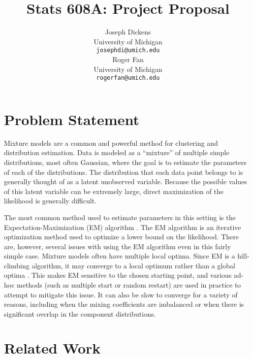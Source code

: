 \documentclass{article}
\theoremstyle{definition}
\begin{document}
\title{Stats 608A: Project Proposal}
\author{
  Joseph Dickens \\
  University of Michigan \\
  \texttt{josephdi@umich.edu} \\
\And
  Roger Fan \\
  University of Michigan\\
  \texttt{rogerfan@umich.edu} \\
}

\maketitle


\section{Problem Statement}

Mixture models are a common and powerful method for clustering and distribution estimation. Data is modeled as a ``mixture'' of multiple simple distributions, most often Gaussian, where the goal is to estimate the parameters of each of the distributions. The distribution that each data point belongs to is generally thought of as a latent unobserved variable. Because the possible values of this latent variable can be extremely large, direct maximization of the likelihood is generally difficult.

The most common method used to estimate parameters in this setting is the Expectation-Maximization (EM) algorithm \cite{dempsterlairdrubin77}. The EM algorithm is an iterative optimization method used to optimize a lower bound on the likelihood. There are, however, several issues with using the EM algorithm even in this fairly simple case. Mixture models often have multiple local optima. Since EM is a hill-climbing algorithm, it may converge to a local optimum rather than a global optima \cite{wu83}. This makes EM sensitive to the chosen starting point, and various ad-hoc methods (such as multiple start or random restart) are used in practice to attempt to mitigate this issue. It can also be slow to converge for a variety of reasons, including when the mixing coefficients are imbalanced or when there is significant overlap in the component distributions.


\section{Related Work}
\end{document}
